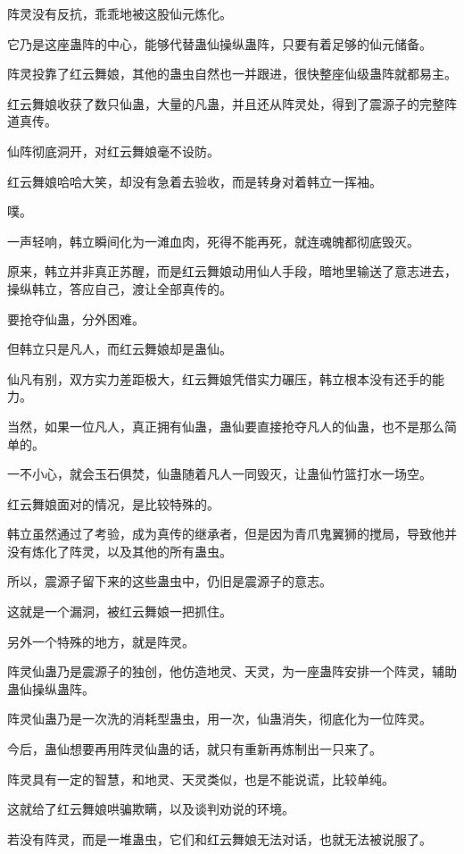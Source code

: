 \begin{this_body}
阵灵没有反抗，乖乖地被这股仙元炼化。

它乃是这座蛊阵的中心，能够代替蛊仙操纵蛊阵，只要有着足够的仙元储备。

阵灵投靠了红云舞娘，其他的蛊虫自然也一并跟进，很快整座仙级蛊阵就都易主。

红云舞娘收获了数只仙蛊，大量的凡蛊，并且还从阵灵处，得到了震源子的完整阵道真传。

仙阵彻底洞开，对红云舞娘毫不设防。

红云舞娘哈哈大笑，却没有急着去验收，而是转身对着韩立一挥袖。

噗。

一声轻响，韩立瞬间化为一滩血肉，死得不能再死，就连魂魄都彻底毁灭。

原来，韩立并非真正苏醒，而是红云舞娘动用仙人手段，暗地里输送了意志进去，操纵韩立，答应自己，渡让全部真传的。

要抢夺仙蛊，分外困难。

但韩立只是凡人，而红云舞娘却是蛊仙。

仙凡有别，双方实力差距极大，红云舞娘凭借实力碾压，韩立根本没有还手的能力。

当然，如果一位凡人，真正拥有仙蛊，蛊仙要直接抢夺凡人的仙蛊，也不是那么简单的。

一不小心，就会玉石俱焚，仙蛊随着凡人一同毁灭，让蛊仙竹篮打水一场空。

红云舞娘面对的情况，是比较特殊的。

韩立虽然通过了考验，成为真传的继承者，但是因为青爪鬼翼狮的搅局，导致他并没有炼化了阵灵，以及其他的所有蛊虫。

所以，震源子留下来的这些蛊虫中，仍旧是震源子的意志。

这就是一个漏洞，被红云舞娘一把抓住。

另外一个特殊的地方，就是阵灵。

阵灵仙蛊乃是震源子的独创，他仿造地灵、天灵，为一座蛊阵安排一个阵灵，辅助蛊仙操纵蛊阵。

阵灵仙蛊乃是一次洗的消耗型蛊虫，用一次，仙蛊消失，彻底化为一位阵灵。

今后，蛊仙想要再用阵灵仙蛊的话，就只有重新再炼制出一只来了。

阵灵具有一定的智慧，和地灵、天灵类似，也是不能说谎，比较单纯。

这就给了红云舞娘哄骗欺瞒，以及谈判劝说的环境。

若没有阵灵，而是一堆蛊虫，它们和红云舞娘无法对话，也就无法被说服了。


\end{this_body}
